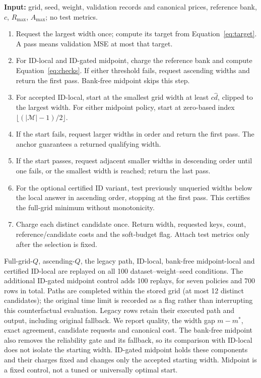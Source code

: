 \medskip\noindent\begin{minipage}{\linewidth}
\begin{Algorithm}
\label{alg:replay}\normalfont\small\leavevmode\par\noindent
\textbf{Input:} grid, seed, weight, validation records and canonical prices,
reference bank, $c$, $R_{\max}$, $A_{\max}$; no test metrics.
\begin{enumerate}
\item Request the largest width once; compute its target from
Equation~\ref{eq:target}. A pass means validation MSE at most that target.
\item For ID-local and ID-gated midpoint, charge the reference bank and
compute Equation~\ref{eq:checks}. If either threshold fails, request
ascending widths and return the first pass. Bank-free midpoint skips this step.
\item For accepted ID-local, start at the smallest grid width at least
$c\hat d$, clipped to the largest width. For either midpoint policy,
start at zero-based index $\lfloor(|\mathcal M|-1)/2\rfloor$.

\item If the start fails, request larger widths in order and return the
first pass. The anchor guarantees a returned qualifying width.
\item If the start passes, request adjacent smaller widths in descending
order until one fails, or the smallest width is reached; return the last pass.
\item For the optional certified ID variant, test previously unqueried
widths below the local answer in ascending order, stopping at the first
pass. This certifies the full-grid minimum without monotonicity.
\item Charge each distinct candidate once. Return width, requested keys,
count, reference/candidate costs and the soft-budget flag. Attach test
metrics only after the selection is fixed.
\end{enumerate}
\end{Algorithm}
\end{minipage}\medskip

Full-grid-$Q$, ascending-$Q$, the legacy path, ID-local, bank-free
midpoint-local and certified ID-local are replayed on all 100
dataset--weight--seed conditions. The additional ID-gated midpoint
control adds 100 replays, for seven policies and 700 rows in total. Paths are completed within the stored grid (at most 12
distinct candidates); the original time limit is recorded as a flag
rather than interrupting this counterfactual evaluation. Legacy rows
retain their executed path and output, including original fallback.
We report quality, the width gap $m-m^*$, exact agreement, candidate
requests and canonical cost. The bank-free midpoint also removes the
reliability gate and its fallback, so its comparison with ID-local does
not isolate the starting width. ID-gated midpoint holds these components
and their charges fixed and changes only the accepted starting width.
Midpoint is a fixed control, not a tuned or universally optimal start.

